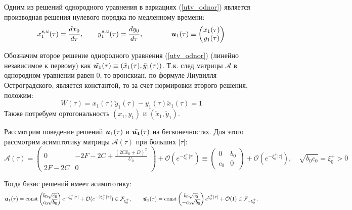 Одним из решений однородного уравнения в вариациях (\ref{utv_odnor}) является производная решения нулевого порядка по медленному времени:
\begin{equation}
        x_1^{s,u}(\tau) = \frac{dx_0}{d \tau}, \qquad
        y_1^{s,u}(\tau) = \frac{dy_0}{d \tau},
    \qquad \qquad \boldsymbol{u}_1(\tau) \equiv \begin{pmatrix} x_1(\tau) \\ y_1(\tau) \end{pmatrix}
\end{equation}

Обозначим второе решение однородного уравнения (\ref{utv_odnor}) (линейно независимое к первому) как $\boldsymbol{ \tilde{u_1}}(\tau) \equiv (\tilde x_1 (\tau), \tilde y_1 (\tau))$. Т.к. след матрицы $\mathcal{A}$ в однородном уравнении равен 0, то вронскиан, по формуле Лиувилля-Остроградского, является константой, то за счет нормировки второго решения, положим:
$$W(\tau) = x_1(\tau) \tilde y_1 (\tau) - y_1 (\tau) \tilde x_1 (\tau) = 1$$
Также потребуем ортогональность $(x_1, y_1)$ и $(\tilde x_1, \tilde y_1)$.

Рассмотрим поведение решений $\boldsymbol{u}_1(\tau)$ и $\boldsymbol{ \tilde{u_1}}(\tau)$ на бесконечностях. Для этого рассмотрим асимптотику матрицы $\mathcal{A}(\tau)$ при больших $|\tau|$:
\begin{equation}
\mathcal{A}(\tau) = \begin{pmatrix} 
0 & -2F-2C + \frac{(2C \hat x_0 +  D)^2}{U_0}\\
2F-2C & 0
\end{pmatrix} + \mathcal{O}(e^{-\xi_0^+ |\tau|}) \equiv 
\begin{pmatrix} 
0 & b_0\\
c_0 & 0
\end{pmatrix} + \mathcal{O}(e^{-\xi_0^+ |\tau|})
,\quad \sqrt{b_0 c_0} = \xi_0^+ > 0 
\end{equation}

Тогда базис решений имеет асимптотику:
$$\boldsymbol{u}_1(\tau) = \text{const} \begin{pmatrix} b_0 \sqrt{c_0} \\ c_0 \sqrt{b_0} \end{pmatrix} e^{-\xi_0^+ |\tau|} + \mathcal{O}(e^{-2\xi_0^+ |\tau|}) 
\in \mathcal{F}_{\xi_0^+}, \qquad 
\boldsymbol{ \tilde{u_1}}(\tau) = \text{const} \begin{pmatrix} b_0 \sqrt{c_0} \\ -c_0 \sqrt{b_0} \end{pmatrix} e^{\xi_0^+ |\tau|} + \mathcal{O}(1) 
\in \mathcal{F}_{-\xi_0^+}.$$

